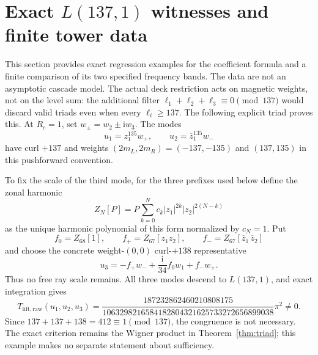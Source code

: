 \documentclass[12pt]{article}
\theoremstyle{definition}
\theoremstyle{remark}
\newcommand{\ii}{\mathrm i}
\begin{document}
\section{Exact \texorpdfstring{$L(137,1)$}{L(137,1)} witnesses and finite tower data}\label{sec:tower}

This section provides exact regression examples for the coefficient formula
and a finite comparison of its two specified frequency bands.  The data are
not an asymptotic cascade model.  The actual deck restriction acts on magnetic
weights, not on the level sum: the additional filter
$\ell_1+\ell_2+\ell_3\equiv0\pmod{137}$ would discard valid triads even
when every $\ell_i\ge137$.  The following explicit triad proves this.  At
$R_c=1$, set $w_\pm=w_2\pm\ii w_3$.  The modes
\[
 u_1=z_1^{135}w_+,\qquad u_2=\overline{z}_1^{135}w_-
\]
have curl $+137$ and weights
$(2m_L,2m_R)=(-137,-135)$ and $(137,135)$ in this pushforward convention.

To fix the scale of the third mode, for the three prefixes used below define
the zonal harmonic
\[
 Z_N[P]=P\sum_{k=0}^Nc_k|z_1|^{2k}|z_2|^{2(N-k)}
\]
as the unique harmonic polynomial of this form normalized by $c_N=1$.  Put
\[
 f_0=Z_{68}[1],\qquad f_+=Z_{67}[z_1z_2],\qquad
 f_-=Z_{67}[\overline z_1\,\overline z_2]
\]
and choose the concrete weight-$(0,0)$ curl-$+138$ representative
\begin{equation}\label{eq:counterexample-u3}
 u_3=-f_+w_-+\frac{\ii}{34}f_0w_1+f_-w_+.
\end{equation}
Thus no free ray scale remains.  All three modes descend to $L(137,1)$, and
exact integration gives
\[
 T_{\mathrm{lift,raw}}(u_1,u_2,u_3)
 =\frac{187232862460210808175}
 {1063298216584182804321625733272656899038}\pi^2\ne0.
\]
Since $137+137+138=412\equiv1\pmod{137}$, the congruence is not necessary.
The exact criterion remains the Wigner product in
Theorem~\ref{thm:triad}; this example makes no separate statement about
sufficiency.
\end{document}
